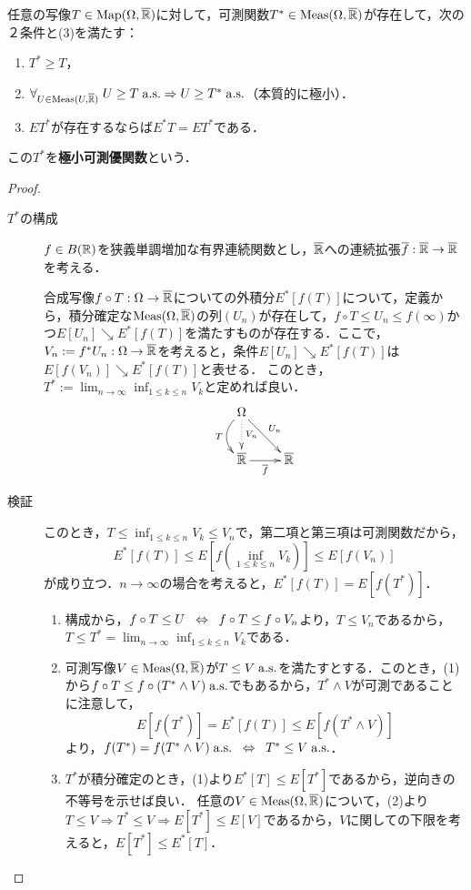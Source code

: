 \documentclass[uplatex,dvipdfmx]{jsreport}
\begin{document}
\begin{lemma}\label{lemma-characterization-of-outer-integral}
    任意の写像$T\in\mathrm{Map}(\Omega,\overline{\mathbb{R}})$に対して，可測関数$T^*\in\mathrm{Meas}(\Omega,\overline{\mathbb{R}})$が存在して，次の２条件と(3)を満たす：
    \begin{enumerate}
        \item $T^*\ge T$，
        \item $\forall_{U\in\mathrm{Meas}(U,\overline{\mathbb{R}})}\;U\ge T\;\mathrm{a.s.}\Rightarrow U\ge T^*\;\mathrm{a.s.}$（本質的に極小）．
        \item $ET^*$が存在するならば$E^*T=ET^*$である．
    \end{enumerate}
    この$T^*$を\textbf{極小可測優関数}という．
\end{lemma}
\begin{proof}\mbox{}
    \begin{description}
        \item[$T^*$の構成] $f\in B(\mathbb{R})$を狭義単調増加な有界連続関数とし，$\overline{\mathbb{R}}$への連続拡張$\overline{f}:\overline{\mathbb{R}}\to\overline{\mathbb{R}}$を考える．
        
        合成写像$f\circ T:\Omega\to\overline{\mathbb{R}}$についての外積分$E^*[f(T)]$について，定義から，積分確定な$\mathrm{Meas}(\Omega,\overline{\mathbb{R}})$の列$(U_n)$が存在して，$f\circ T\le U_n\le f(\infty)$かつ$E[U_n]\searrow E^*[f(T)]$を満たすものが存在する．ここで，$V_n:=f^*U_n:\Omega\to\overline{\mathbb{R}}$を考えると，条件$E[U_n]\searrow E^*[f(T)]$は$E[f(V_n)]\searrow E^*[f(T)]$と表せる．
        このとき，$T^*:=\lim_{n\to\infty}\inf_{1\le k\le n}V_k$と定めれば良い．
        \[\xymatrix{
            \Om\ar@{.>}[d]^-{V_n}\ar@/_1pc/[d]_-T\ar[dr]^-{U_n}\\
            \oR\ar[r]_-{\o{f}}&\oR
        }\]
        \item[検証]
        このとき，$T\le\inf_{1\le k\le n}V_k\le V_n$で，第二項と第三項は可測関数だから，
        \[E^*[f(T)]\le E[f(\inf_{1\le k\le n}V_k)]\le E[f(V_n)]\]
        が成り立つ．$n\to\infty$の場合を考えると，$E^*[f(T)]=E[f(T^*)]$．
        \begin{enumerate}
            \item 構成から，$f\circ T\le U\;\;\Leftrightarrow\;\; f\circ T\le f\circ V_n$より，$T\le V_n$であるから，$T\le T^*=\lim_{n\to\infty}\inf_{1\le k\le n}V_k$である．
            \item 可測写像$V\in\mathrm{Meas}(\Omega,\overline{\mathbb{R}})$が$T\le V\;\mathrm{a.s.}$を満たすとする．このとき，(1)から$f\circ T\le f\circ(T^*\land V)\;\mathrm{a.s.}$でもあるから，$T^*\land V$が可測であることに注意して，
            \[E[f(T^*)]=E^*[f(T)]\le E[f(T^*\land V)]\]
            より，$f(T^*)=f(T^*\land V)\;\mathrm{a.s.}\;\;\Leftrightarrow\;\; T^*\le V\;\mathrm{a.s.}$．
            \item $T^*$が積分確定のとき，(1)より$E^*[T]\le E[T^*]$であるから，逆向きの不等号を示せば良い．
            任意の$V\in\mathrm{Meas}(\Omega,\overline{\mathbb{R}})$について，(2)より$T\le V\Rightarrow T^*\le V\Rightarrow E[T^*]\le E[V]$であるから，$V$に関しての下限を考えると，$E[T^*]\le E^*[T]$．
        \end{enumerate}
    \end{description}
\end{proof}
\end{document}
